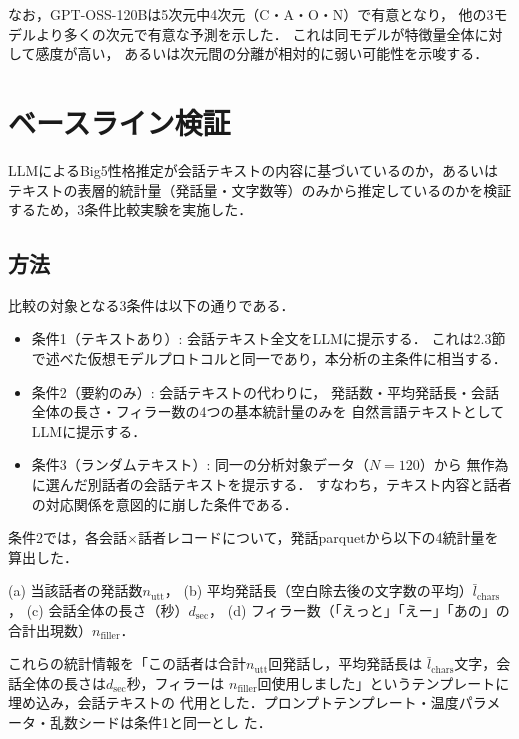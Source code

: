 \documentclass[dvipdfmx,11pt,a4paper]{bxjsarticle}
\renewcommand{\_}{\paperorigunderscore\allowbreak}%
\begin{document}
なお，GPT-OSS-120Bは5次元中4次元（C・A・O・N）で有意となり，
他の3モデルより多くの次元で有意な予測を示した．
これは同モデルが特徴量全体に対して感度が高い，
あるいは次元間の分離が相対的に弱い可能性を示唆する．





\section{ベースライン検証}
\label{sec:baseline_validation}

LLMによるBig5性格推定が会話テキストの内容に基づいているのか，あるいはテキストの表層的統計量（発話量・文字数等）のみから推定しているのかを検証するため，3条件比較実験を実施した．

\subsection{方法}
\label{sec:baseline_validation_method}

比較の対象となる3条件は以下の通りである．

\begin{itemize}
  \item 条件1（テキストあり）: 会話テキスト全文をLLMに提示する．
    これは2.3節で述べた仮想モデルプロトコルと同一であり，本分析の主条件に相当する．
  \item 条件2（要約のみ）: 会話テキストの代わりに，
    発話数・平均発話長・会話全体の長さ・フィラー数の4つの基本統計量のみを
    自然言語テキストとしてLLMに提示する．
  \item 条件3（ランダムテキスト）: 同一の分析対象データ（$N = 120$）から
    無作為に選んだ別話者の会話テキストを提示する．
    すなわち，テキスト内容と話者の対応関係を意図的に崩した条件である．
\end{itemize}

条件2では，各会話$\times$話者レコードについて，発話parquetから以下の4統計量を算出した．

(a) 当該話者の発話数$n_{\text{utt}}$，
(b) 平均発話長（空白除去後の文字数の平均）$\bar{l}_{\text{chars}}$，
(c) 会話全体の長さ（秒）$d_{\text{sec}}$，
(d) フィラー数（「えっと」「えー」「あの」の合計出現数）$n_{\text{filler}}$．

これらの統計情報を「この話者は合計$n_{\text{utt}}$回発話し，平均発話長は
$\bar{l}_{\text{chars}}$文字，会話全体の長さは$d_{\text{sec}}$秒，フィラーは
$n_{\text{filler}}$回使用しました」というテンプレートに埋め込み，会話テキストの
代用とした．プロンプトテンプレート・温度パラメータ・乱数シードは条件1と同一とし
た．
\end{document}
